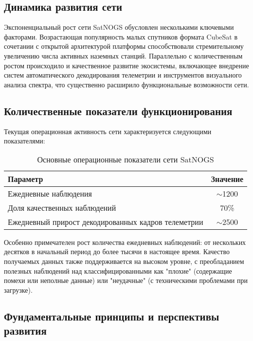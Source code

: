 \subsection{Динамика развития сети}

Экспоненциальный рост сети SatNOGS обусловлен несколькими ключевыми факторами.
Возрастающая популярность малых спутников формата CubeSat в сочетании с
открытой архитектурой платформы способствовали стремительному увеличению числа
активных наземных станций. Параллельно с количественным ростом происходило и
качественное развитие экосистемы, включающее внедрение систем автоматического
декодирования телеметрии и инструментов визуального анализа спектра, что
существенно расширило функциональные возможности сети.

\subsection{Количественные показатели функционирования}

Текущая операционная активность сети характеризуется следующими показателями:

\begin{table}[h]
	\centering
	\begin{tabular}{|l|c|}
		\hline
		\textbf{Параметр}                                   & \textbf{Значение} \\
		\hline
		Ежедневные наблюдения                               & $\sim$1200        \\
		Доля качественных наблюдений                        & 70\%              \\
		Ежедневный прирост декодированных кадров телеметрии & $\sim$2500        \\
		\hline
	\end{tabular}
	\caption{Основные операционные показатели сети SatNOGS}
	\label{tab:satnogs_stats}
\end{table}

Особенно примечателен рост количества ежедневных наблюдений: от нескольких
десятков в начальный период до более тысячи в настоящее время. Качество
получаемых данных также поддерживается на высоком уровне, с преобладанием
полезных наблюдений над классифицированными как "плохие" (содержащие помехи или
неполные данные) или "неудачные" (с техническими проблемами при загрузке).

\subsection{Фундаментальные принципы и перспективы развития}

